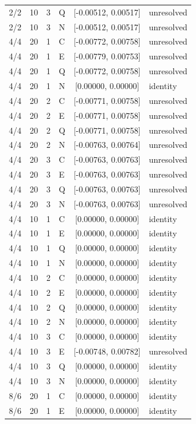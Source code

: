 \begin{longtable}{rrrlcl}
2/2 & 10 & 3 & Q & [-0.00512, 0.00517] & unresolved \\
2/2 & 10 & 3 & N & [-0.00512, 0.00517] & unresolved \\
4/4 & 20 & 1 & C & [-0.00772, 0.00758] & unresolved \\
4/4 & 20 & 1 & E & [-0.00779, 0.00753] & unresolved \\
4/4 & 20 & 1 & Q & [-0.00772, 0.00758] & unresolved \\
4/4 & 20 & 1 & N & [0.00000, 0.00000] & identity \\
4/4 & 20 & 2 & C & [-0.00771, 0.00758] & unresolved \\
4/4 & 20 & 2 & E & [-0.00771, 0.00758] & unresolved \\
4/4 & 20 & 2 & Q & [-0.00771, 0.00758] & unresolved \\
4/4 & 20 & 2 & N & [-0.00763, 0.00764] & unresolved \\
4/4 & 20 & 3 & C & [-0.00763, 0.00763] & unresolved \\
4/4 & 20 & 3 & E & [-0.00763, 0.00763] & unresolved \\
4/4 & 20 & 3 & Q & [-0.00763, 0.00763] & unresolved \\
4/4 & 20 & 3 & N & [-0.00763, 0.00763] & unresolved \\
4/4 & 10 & 1 & C & [0.00000, 0.00000] & identity \\
4/4 & 10 & 1 & E & [0.00000, 0.00000] & identity \\
4/4 & 10 & 1 & Q & [0.00000, 0.00000] & identity \\
4/4 & 10 & 1 & N & [0.00000, 0.00000] & identity \\
4/4 & 10 & 2 & C & [0.00000, 0.00000] & identity \\
4/4 & 10 & 2 & E & [0.00000, 0.00000] & identity \\
4/4 & 10 & 2 & Q & [0.00000, 0.00000] & identity \\
4/4 & 10 & 2 & N & [0.00000, 0.00000] & identity \\
4/4 & 10 & 3 & C & [0.00000, 0.00000] & identity \\
4/4 & 10 & 3 & E & [-0.00748, 0.00782] & unresolved \\
4/4 & 10 & 3 & Q & [0.00000, 0.00000] & identity \\
4/4 & 10 & 3 & N & [0.00000, 0.00000] & identity \\
8/6 & 20 & 1 & C & [0.00000, 0.00000] & identity \\
8/6 & 20 & 1 & E & [0.00000, 0.00000] & identity \\

\end{longtable}
